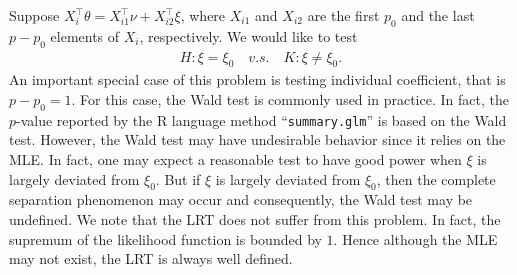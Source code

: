 \documentclass[11pt]{article}
\newcommand{\myT}{\intercal}
\theoremstyle{plain}
\theoremstyle{definition}
\theoremstyle{remark}
\begin{document}
    Suppose $X_i^\myT \theta = X_{i1}^\myT \nu + X_{i2}^\myT \xi$, where $X_{i1}$ and $X_{i2}$ are the first $p_0$ and the last $p-p_0$ elements of $X_i$, respectively.
    We would like to test 
\begin{align*}
    H:\xi= \xi_0 \quad v.s.\quad K: \xi\neq \xi_0. 
\end{align*}
An important special case of this problem is testing individual coefficient, that is $p-p_0 = 1$.
For this case, the Wald test is commonly used in practice.
In fact, the $p$-value reported by the R language \citep{R2020} method ``\texttt{summary.glm}'' is based on the Wald test.
However, the Wald test may have undesirable behavior since it relies on the MLE.
In fact, one may expect a reasonable test to have good power when $\xi$ is largely deviated from $\xi_0$.
But if $\xi$ is largely deviated from $\xi_0$, then the complete separation phenomenon may occur and consequently, the Wald test may be undefined.
We note that the LRT does not suffer from this problem.
In fact, the supremum of the likelihood function is bounded by $1$.
Hence although the MLE may not exist, the LRT is always well defined.
\end{document}
